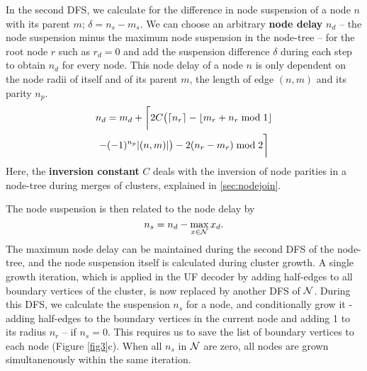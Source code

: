In the second DFS, we calculate for the difference in node suspension of a node $n$ with its parent $m$; $\delta = n_s - m_s$. We can choose an arbitrary \textbf{node delay} $n_d$ -- the node suspension minus the maximum node suspension in the node-tree -- for the root node $r$ such as $r_d=0$ and add the suspension difference $\delta$ during each step to obtain $n_d$ for every node. This node delay of a node $n$ is only dependent on the node radii of itself and of its parent $m$, the length of edge $(n,m)$ and its parity $n_p$. 
\begin{multline}\label{eq:delayequation}
    n_d = m_d + \bigg \lceil 2C\big(\ceil{n_r} - \floor{m_r + n_r \bmod 1}\\
    - (-1)^{n_p}\abs{(n,m)}\big) - 2(n_r - m_r) \bmod2 \bigg \rceil
\end{multline}
Here, the \textbf{inversion constant} $C$ deals with the inversion of node parities in a node-tree during merges of clusters, explained in \ref{sec:nodejoin}. %

The node suspension is then related to the node delay by
\begin{equation*}
    n_s = n_d - \max_{x \in \mathcal{N}}{x_d}. 
\end{equation*}
The maximum node delay can be maintained during the second DFS of the node-tree, and the node suspension itself is calculated during cluster growth. A single growth iteration, which is applied in the UF decoder by adding half-edges to all boundary vertices of the cluster, is now replaced by another DFS of $\mathcal{N}$. During this DFS, we calculate the suspension $n_s$ for a node, and conditionally grow it - adding half-edges to the boundary vertices in the current node and adding 1 to its radius $n_r$ -- if $n_s = 0$. This requires us to save the list of boundary vertices to each node (Figure \ref{fig3}c). When all $n_s$ in $\mathcal{N}$ are zero, all nodes are grown simultanenously within the same iteration. 

